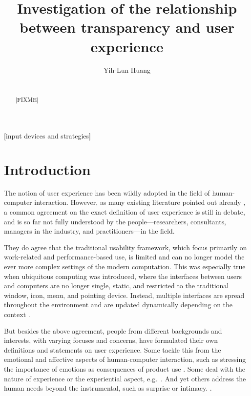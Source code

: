 \documentclass{acm_proc_article-sp}
\begin{document}
\title{Investigation of the relationship between transparency and user
  experience}

\author{
\alignauthor Yih-Lun Huang\\
\\
}

\maketitle
\begin{abstract}
[FIXME]
\end{abstract}


[input devices and strategies]




\section{Introduction}
The notion of user experience has been wildly adopted in the field of
human-computer interaction. However, as many existing literature
pointed out already \citep{ux:hassenzahl, ux:law}, a common agreement
on the exact definition of user experience is still in debate, and is
so far not fully understood by the people---researchers, consultants,
managers in the industry, and practitioners---in the field.

They do agree that the traditional usability framework, which focus
primarily on work-related and performance-based use, is limited and
can no longer model the ever more complex settings of the modern
computation. This was especially true when ubiquitous computing was
introduced, where the interfaces between users and computers are no
longer single, static, and restricted to the traditional window, icon,
menu, and pointing device. Instead, multiple interfaces are spread
throughout the environment and are updated dynamically depending on
the context \citep{windows:bolter}.

But besides the above agreement, people from different backgrounds and
interests, with varying focuses and concerns, have formulated their
own definitions and statements on user experience. Some tackle this
from the emotional and affective aspects of human-computer
interaction, such as stressing the importance of emotions as
consequences of product use \citep{emotions:desmet}. Some deal with
the nature of experience or the experiential aspect,
e.g.\ \citet{experience:forlizzi}. And yet others address the human
needs beyond the instrumental, such as surprise or intimacy.
\citep{alternatives:gaver}.
\end{document}
